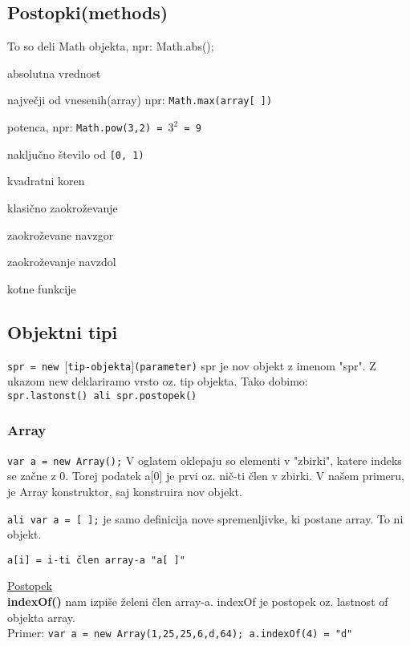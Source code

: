 \subsection{Postopki(methods)}
To so deli Math objekta, npr: Math.abs();
\begin{description}[align=left, labelwidth=2cm]
	\item[abs()] absolutna vrednost
	\item[max()] največji od vnesenih(array) npr: \texttt{Math.max(array[ ])}
	\item[pow()] potenca, npr: \texttt{Math.pow(3,2) = $3^2$ = 9}
	
	\item[random()] naključno število od \texttt{[0, 1)}
	\item[sqrt()] kvadratni koren
	\item[round()] klasično zaokroževanje
	\item[ceil()] zaokroževane navzgor
	\item[floor()] zaokroževanje navzdol
	\item[sin(), cos(), tan()] kotne funkcije
\end{description}

\subsection{Objektni tipi}

\texttt{spr = new $[$tip-objekta$]$(parameter)}
spr je nov objekt z imenom "spr". Z ukazom new deklariramo vrsto oz. tip objekta. Tako dobimo:\\
\texttt{spr.lastonst() ali spr.postopek()}

\subsubsection*{Array}

\texttt{var a = new Array();}
V oglatem oklepaju so elementi v "zbirki", katere indeks se začne z 0. Torej podatek a[0] je prvi oz. nič-ti člen v zbirki.
V našem primeru, je Array konstruktor, saj konstruira nov objekt.

\texttt{ali var a = [ ];} je samo definicija nove spremenljivke, ki postane array. To ni objekt.

\texttt{a[i] = i-ti člen array-a "a[ ]"}

\underline{Postopek}\\
\textbf{indexOf()} nam izpiše želeni člen array-a. indexOf je postopek oz. lastnost of objekta array.\\
Primer:
\texttt{var a = new Array(1,25,25,6,d,64); a.indexOf(4) = "d"}

